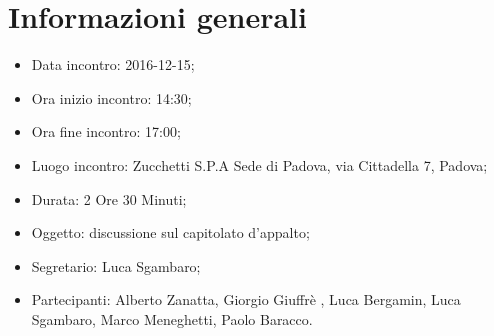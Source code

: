 \documentclass[a4paper,titlepage]{article}
\begin{document}
\section{Informazioni generali}
\begin{itemize}
\item Data incontro: 2016-12-15;
\item Ora inizio incontro: 14:30;
\item Ora fine incontro: 17:00;
\item Luogo incontro: Zucchetti S.P.A Sede di Padova, via Cittadella 7, Padova; 
\item Durata: 2 Ore 30 Minuti;
\item Oggetto: discussione sul capitolato d’appalto;
\item Segretario: Luca Sgambaro; 
\item Partecipanti: Alberto Zanatta, Giorgio Giuffrè , Luca Bergamin, Luca Sgambaro, Marco Meneghetti, Paolo Baracco.
\end{itemize}
\end{document}
